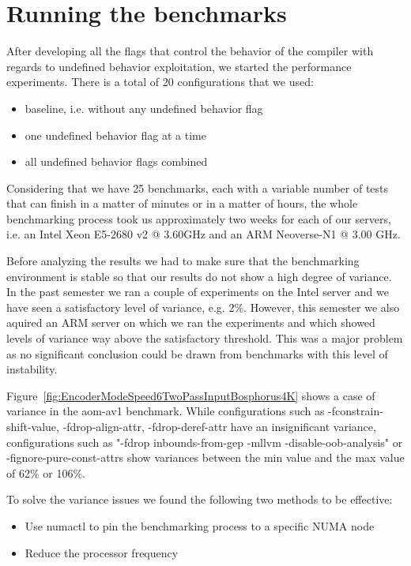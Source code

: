 \section{Running the benchmarks}

After developing all the flags that control the behavior of the compiler with
regards to undefined behavior exploitation, we started the performance
experiments. There is a total of 20 configurations that we used:
\begin{itemize}
  \item baseline, i.e. without any undefined behavior flag
  \item one undefined behavior flag at a time
  \item all undefined behavior flags combined
\end{itemize}

Considering that we have 25 benchmarks, each with a variable number of tests
that can finish in a matter of minutes or in a matter of hours, the whole
benchmarking process took us approximately two weeks for each of our servers,
i.e. an Intel Xeon E5-2680 v2 @ 3.60GHz and an ARM Neoverse-N1 @ 3.00 GHz.

Before analyzing the results we had to make sure that the benchmarking
environment is stable so that our results do not show a high degree of variance.
In the past semester we ran a couple of experiments on the Intel server and we
have seen a satisfactory level of variance, e.g. 2\%. However, this semester we
also aquired an ARM server on which we ran the experiments and which showed
levels of variance way above the satisfactory threshold. This was a major
problem as no significant conclusion could be drawn from benchmarks with this
level of instability.

Figure~\ref{fig:EncoderModeSpeed6TwoPassInputBosphorus4K} shows a case of
variance in the aom-av1 benchmark. While configurations such as
-fconstrain-shift-value, -fdrop-align-attr, -fdrop-deref-attr have an
insignificant variance, configurations such as "-fdrop inbounds-from-gep -mllvm
-disable-oob-analysis" or -fignore-pure-const-attrs show variances between the
min value and the max value of 62\% or 106\%.

To solve the variance issues we found the following two methods to be effective:
\begin{itemize}
  \item Use numactl to pin the benchmarking process to a specific NUMA node
  \item Reduce the processor frequency
\end{itemize}

